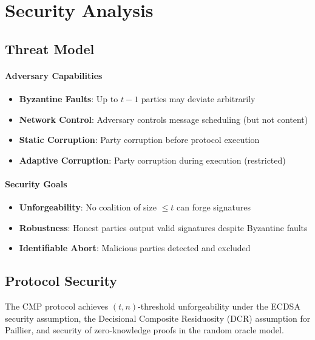 \section{Security Analysis}


\subsection{Threat Model}

\paragraph{Adversary Capabilities}
\begin{itemize}
\item \textbf{Byzantine Faults}: Up to $t-1$ parties may deviate arbitrarily
\item \textbf{Network Control}: Adversary controls message scheduling (but not content)
\item \textbf{Static Corruption}: Party corruption before protocol execution
\item \textbf{Adaptive Corruption}: Party corruption during execution (restricted)
\end{itemize}

\paragraph{Security Goals}
\begin{itemize}
\item \textbf{Unforgeability}: No coalition of size $\leq t$ can forge signatures
\item \textbf{Robustness}: Honest parties output valid signatures despite Byzantine faults
\item \textbf{Identifiable Abort}: Malicious parties detected and excluded
\end{itemize}

\subsection{Protocol Security}

\begin{theorem}
The CMP protocol achieves $(t,n)$-threshold unforgeability under the ECDSA security assumption, the Decisional Composite Residuosity (DCR) assumption for Paillier, and security of zero-knowledge proofs in the random oracle model.
\end{theorem}

